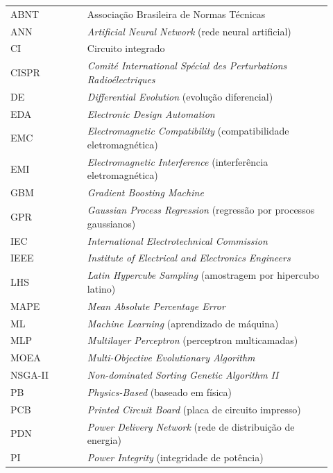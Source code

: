 

\begin{listaabrev}

\begin{longtable}[l]{p{0.22\linewidth}p{0.70\linewidth}}
ABNT & Associação Brasileira de Normas Técnicas\\
ANN & \textit{Artificial Neural Network} (rede neural artificial)\\
CI & Circuito integrado\\
CISPR & \textit{Comité International Spécial des Perturbations Radioélectriques}\\
DE & \textit{Differential Evolution} (evolução diferencial)\\
EDA & \textit{Electronic Design Automation}\\
EMC & \textit{Electromagnetic Compatibility} (compatibilidade eletromagnética)\\
EMI & \textit{Electromagnetic Interference} (interferência eletromagnética)\\
GBM & \textit{Gradient Boosting Machine}\\
GPR & \textit{Gaussian Process Regression} (regressão por processos gaussianos)\\
IEC & \textit{International Electrotechnical Commission}\\
IEEE & \textit{Institute of Electrical and Electronics Engineers}\\
LHS & \textit{Latin Hypercube Sampling} (amostragem por hipercubo latino)\\
MAPE & \textit{Mean Absolute Percentage Error}\\
ML & \textit{Machine Learning} (aprendizado de máquina)\\
MLP & \textit{Multilayer Perceptron} (perceptron multicamadas)\\
MOEA & \textit{Multi-Objective Evolutionary Algorithm}\\
NSGA-II & \textit{Non-dominated Sorting Genetic Algorithm II}\\
PB & \textit{Physics-Based} (baseado em física)\\
PCB & \textit{Printed Circuit Board} (placa de circuito impresso)\\
PDN & \textit{Power Delivery Network} (rede de distribuição de energia)\\
PI & \textit{Power Integrity} (integridade de potência)\\

\end{longtable}
\end{listaabrev}
